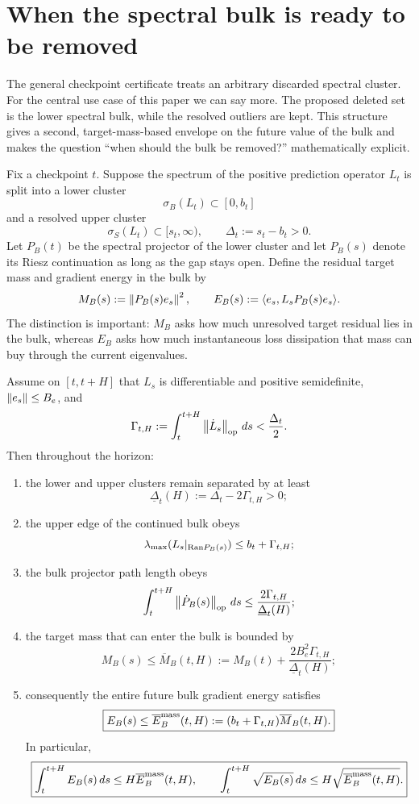 \section{When the spectral bulk is ready to be removed}
The general checkpoint certificate treats an arbitrary discarded spectral cluster.  For the central use case of this paper we can say more.  The proposed deleted set is the lower spectral bulk, while the resolved outliers are kept.  This structure gives a second, target-mass-based envelope on the future value of the bulk and makes the question ``when should the bulk be removed?'' mathematically explicit.

Fix a checkpoint $t$.  Suppose the spectrum of the positive prediction operator $L_t$ is split into a lower cluster
\[
\sigma_B(L_t)\subset[0,b_t]
\]
and a resolved upper cluster
\[
\sigma_S(L_t)\subset[s_t,\infty),
\qquad
\Delta_t:=s_t-b_t>0.
\]
Let $P_B(t)$ be the spectral projector of the lower cluster and let $P_B(s)$ denote its Riesz continuation as long as the gap stays open.  Define the residual target mass and gradient energy in the bulk by
\[
M_B(s):=\left\lVert P_B(s)e_s\right\rVert^2,
\qquad
E_B(s):=\langle e_s,L_sP_B(s)e_s\rangle.
\]
The distinction is important: $M_B$ asks how much unresolved target residual lies in the bulk, whereas $E_B$ asks how much instantaneous loss dissipation that mass can buy through the current eigenvalues.

\begin{theorem}\label{thm:bulk-mass}
Assume on $[t,t+H]$ that $L_s$ is differentiable and positive semidefinite, $\left\lVert e_s\right\rVert\le B_e$, and
\[
\Gamma_{t,H}:=\int_t^{t+H}\left\lVert \dot L_s\right\rVert_{\mathrm{op}}\,ds
<\frac{\Delta_t}{2}.
\]
Then throughout the horizon:
\begin{enumerate}[label=(\roman*)]
\item the lower and upper clusters remain separated by at least
\[
\underline\Delta_t(H):=\Delta_t-2\Gamma_{t,H}>0;
\]
\item the upper edge of the continued bulk obeys
\[
\lambda_{\max}(L_s|_{\mathrm{Ran} P_B(s)})\le b_t+\Gamma_{t,H};
\]
\item the bulk projector path length obeys
\[
\int_t^{t+H}\left\lVert \dot P_B(s)\right\rVert_{\mathrm{op}}\,ds
\le
\frac{2\Gamma_{t,H}}{\underline\Delta_t(H)};
\]
\item the target mass that can enter the bulk is bounded by
\[
\boxed{
M_B(s)
\le
\overline M_B(t,H)
:=M_B(t)+
\frac{2B_e^2\Gamma_{t,H}}{\underline\Delta_t(H)};}
\]
\item consequently the entire future bulk gradient energy satisfies
\[
\boxed{
E_B(s)
\le
\overline E_B^{\rm mass}(t,H)
:=(b_t+\Gamma_{t,H})\overline M_B(t,H).}
\]
In particular,
\[
\boxed{
\int_t^{t+H}E_B(s)\,ds
\le H\overline E_B^{\rm mass}(t,H),
\qquad
\int_t^{t+H}\sqrt{E_B(s)}\,ds
\le H\sqrt{\overline E_B^{\rm mass}(t,H)}.}
\]
\end{enumerate}
\end{theorem}

